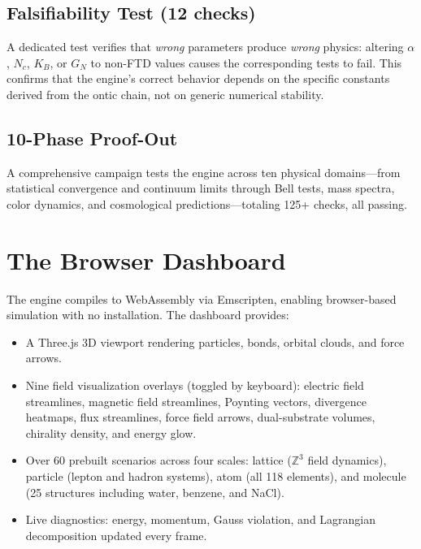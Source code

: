 \documentclass[11pt,a4paper]{article}
\newcommand{\Nc}{N_c}
\newcommand{\KB}{K_B}
\newcommand{\ZZ}{\mathbb{Z}}
\theoremstyle{compact}
\begin{document}
\subsection*{Falsifiability Test (12 checks)}

A dedicated test verifies that \emph{wrong} parameters produce \emph{wrong} physics: altering $\alpha$, $\Nc$, $\KB$, or $G_N$ to non-FTD values causes the corresponding tests to fail. This confirms that the engine's correct behavior depends on the specific constants derived from the ontic chain, not on generic numerical stability.

\subsection*{10-Phase Proof-Out}

A comprehensive campaign tests the engine across ten physical domains---from statistical convergence and continuum limits through Bell tests, mass spectra, color dynamics, and cosmological predictions---totaling 125+ checks, all passing.


\section{The Browser Dashboard}
\label{sec:dashboard}

The engine compiles to WebAssembly via Emscripten, enabling browser-based simulation with no installation. The dashboard provides:

\begin{itemize}[nosep]
\item A Three.js 3D viewport rendering particles, bonds, orbital clouds, and force arrows.
\item Nine field visualization overlays (toggled by keyboard): electric field streamlines, magnetic field streamlines, Poynting vectors, divergence heatmaps, flux streamlines, force field arrows, dual-substrate volumes, chirality density, and energy glow.
\item Over 60 prebuilt scenarios across four scales: lattice ($\ZZ^3$ field dynamics), particle (lepton and hadron systems), atom (all 118 elements), and molecule (25 structures including water, benzene, and NaCl).
\item Live diagnostics: energy, momentum, Gauss violation, and Lagrangian decomposition updated every frame.
\end{itemize}
\end{document}
